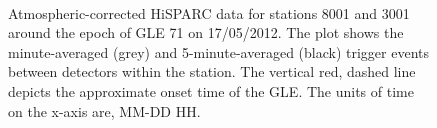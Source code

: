 \begin{figure}[ht!]
	\centering
	 \\
	
	
	\caption{Atmospheric-corrected HiSPARC data for stations 8001 and 3001 around the epoch of GLE 71 on 17/05/2012. The plot shows the minute-averaged (grey) and 5-minute-averaged (black) trigger events between detectors within the station. The vertical red, dashed line depicts the approximate onset time of the GLE. The units of time on the x-axis are, MM-DD HH.}
	\label{fig:GLE_71_Pcorr}
\end{figure}
%
%
%
